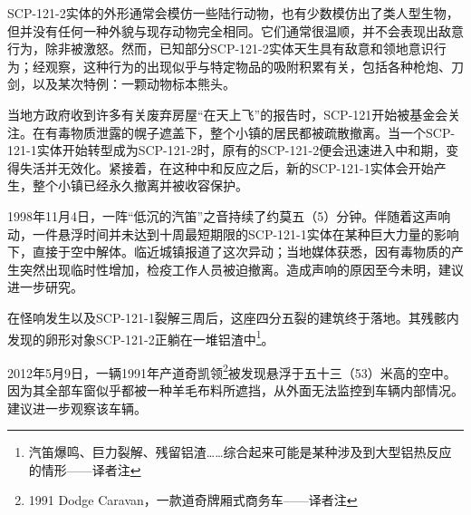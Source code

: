 SCP-121-2实体的外形通常会模仿一些陆行动物，也有少数模仿出了类人型生物，但并没有任何一种外貌与现存动物完全相同。它们通常很温顺，并不会表现出敌意行为，除非被激怒。然而，已知部分SCP-121-2实体天生具有敌意和领地意识行为；经观察，这种行为的出现似乎与特定物品的吸附积累有关，包括各种枪炮、刀剑，以及某次特例：一颗动物标本熊头。

当地方政府收到许多有关废弃房屋“在天上飞”的报告时，SCP-121开始被基金会关注。在有毒物质泄露的幌子遮盖下，整个小镇的居民都被疏散撤离。当一个SCP-121-1实体开始转型成为SCP-121-2时，原有的SCP-121-2便会迅速进入中和期，变得失活并无效化。紧接着，在这种中和反应之后，新的SCP-121-1实体会开始产生，整个小镇已经永久撤离并被收容保护。

1998年11月4日，一阵“低沉的汽笛”之音持续了约莫五（5）分钟。伴随着这声响动，一件悬浮时间并未达到十周最短期限的SCP-121-1实体在某种巨大力量的影响下，直接于空中解体。临近城镇报道了这次异动；当地媒体获悉，因有毒物质的产生突然出现临时性增加，检疫工作人员被迫撤离。造成声响的原因至今未明，建议进一步研究。

在怪响发生以及SCP-121-1裂解三周后，这座四分五裂的建筑终于落地。其残骸内发现的卵形对象SCP-121-2正躺在一堆铝渣中\footnote{汽笛爆鸣、巨力裂解、残留铝渣……综合起来可能是某种涉及到大型铝热反应的情形——译者注}。

2012年5月9日，一辆1991年产道奇凯领\footnote{1991 Dodge Caravan，一款道奇牌厢式商务车——译者注}被发现悬浮于五十三（53）米高的空中。因为其全部车窗似乎都被一种羊毛布料所遮挡，从外面无法监控到车辆内部情况。建议进一步观察该车辆。
